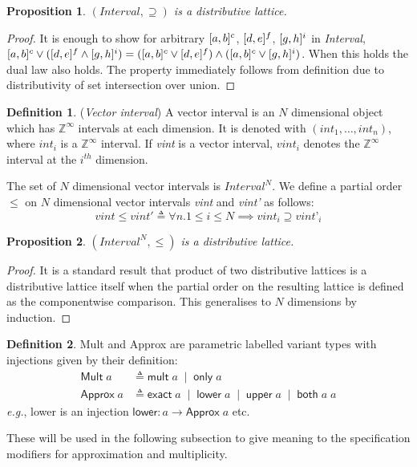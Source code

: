 \documentclass{article}
\theoremstyle{definition}
\newtheorem{defn}{Definition}
\theoremstyle{plain}
\newtheorem{prop}{Proposition}
\newcommand{\eg}{\emph{e.g.}}
\newcommand{\zinf}{\textnormal{$\mathbb{Z}^\infty$}}
\newcommand{\interv}[3]{\textnormal{$\lbrack#1,#2\rbrack^{#3}$}}
\begin{document}
\begin{prop}{}
  $(\textit{Interval},\supseteq)$ is a distributive lattice.
\end{prop}
%
\begin{proof}
  It is enough to show for arbitrary $\interv{a}{b}{c}$, $\interv{d}{e}{f}$,
  $\interv{g}{h}{i}$ in \textit{Interval}, $\interv{a}{b}{c} \vee
  (\interv{d}{e}{f} \wedge \interv{g}{h}{i}) = (\interv{a}{b}{c} \vee
  \interv{d}{e}{f}) \wedge (\interv{a}{b}{c} \vee \interv{g}{h}{i})$. When this
  holds the dual law also holds. The property immediately follows from
  definition due to distributivity of set intersection over union.
\end{proof}
%
\begin{defn}{(\emph{Vector interval})}
  A vector interval is an $N$ dimensional object which has \zinf{} intervals at
  each dimension. It is denoted with $(\textit{int}_1, \dots, \textit{int}_n)$,
  where $\textit{int}_i$ is a \zinf{} interval. If \textit{vint} is a vector
  interval, $\textit{vint}_i$ denotes the \zinf{} interval at the $i^{th}$
  dimension.

  The set of $N$ dimensional vector intervals is $\textit{Interval}^N$. We
  define a partial order $\leq$ on $N$ dimensional vector intervals
  \textit{vint} and \textit{vint'} as follows:
%
  \begin{equation*}
    \textit{vint} \leq \textit{vint}' \triangleq
      \forall n. 1
        \leq i \leq N \implies \textit{vint}_i \supseteq \textit{vint'}_i
  \end{equation*}
\end{defn}
%
\begin{prop}{}
  $(\textit{Interval}^N, \leq)$ is a distributive lattice.
\end{prop}
%
\begin{proof}
  It is a standard result that product of two distributive lattices is a
  distributive lattice itself when the partial order on the resulting lattice is
  defined as the componentwise comparison. This generalises to $N$ dimensions by
  induction.
\end{proof}

\begin{defn}{}
  \textsf{Mult} and \textsf{Approx} are parametric labelled variant types with
  injections given by their definition:
%
  \begin{align*}
    \textsf{Mult} \; a &
      \triangleq \textsf{mult} \; a \;\mid\; \textsf{only} \; a \\
    \textsf{Approx} \; a &
      \triangleq \textsf{exact} \; a \;\mid\; \textsf{lower} \; a \;\mid\;
        \textsf{upper} \; a \;\mid\; \textsf{both} \; a \; a
  \end{align*}
%
  \eg{}, \textsf{lower} is an injection $\mathsf{lower} : a \to \mathsf{Approx}
  \; a$ etc.

  These will be used in the following subsection to give meaning to the
  specification modifiers for approximation and multiplicity.
\end{defn}
\end{document}

